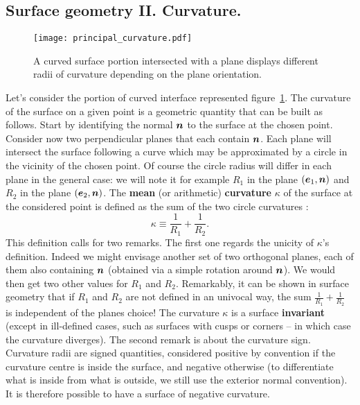 \subsection{Surface geometry II. Curvature.}
\begin{figure}[htbp]
\begin{center}
\texttt{[image: principal\_curvature.pdf]} 
\end{center}
\caption{A curved surface portion intersected with a plane displays different radii of curvature depending on the plane orientation.}
\label{fig:principal_curvature}
\end{figure}
Let's consider the portion of curved interface represented figure~\ref{fig:principal_curvature}. The curvature of the surface on a given point is a geometric quantity that can be built as follows. Start by identifying the normal $\bn$ to the surface at the chosen point. Consider now two perpendicular planes that each contain $\bn$. Each plane will intersect the surface following a curve which may be approximated by a circle in the vicinity of the chosen point. Of course the circle radius will differ in each plane in the general case: we will note it for example $R_1$ in the plane $\lp\be_1,\bn\rp$ and $R_2$ in the plane $\lp\be_2,\bn\rp$. The \textbf{mean} (or arithmetic) \textbf{curvature} $\kappa$ of the surface at the considered point is defined as the sum of the two circle curvatures :
\begin{equation}
\kappa \equiv \frac{1}{R_1} + \frac{1}{R_2}.
\end{equation}
This definition calls for two remarks. The first one regards the unicity of $\kappa$'s definition. Indeed we might envisage another set of two orthogonal planes, each of them also containing $\bn$ (obtained via a simple rotation around $\bn$). We would then get two other values for $R_1$ and $R_2$. Remarkably, it can be shown in surface geometry that if $R_1$ and $R_2$ are not defined in an univocal way, the sum $\frac{1}{R_1} + \frac{1}{R_2}$ is independent of the planes choice! The curvature $\kappa$ is a surface \textbf{invariant} (except in ill-defined cases, such as surfaces with cusps or corners -- in which case the curvature diverges). The second remark is about the curvature sign. Curvature radii are signed quantities, considered positive by convention if the curvature centre is inside the surface, and negative otherwise (to differentiate what is inside from what is outside, we still use the exterior normal convention). It is therefore possible to have a surface of negative curvature.

